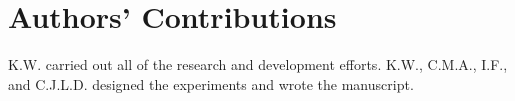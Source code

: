 \section{Authors' Contributions}
K.W. carried out all of the research and development efforts. K.W., C.M.A., I.F., and C.J.L.D. designed the experiments and wrote the manuscript. 